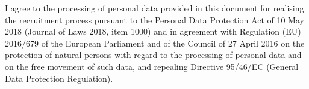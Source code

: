 \documentclass[A4,11pt]{article}
\begin{document}
{\tiny 
  I agree to the processing of personal data provided in this document for realising
  the recruitment process pursuant to the Personal Data Protection Act of 10 May 2018 (Journal of
  Laws 2018, item 1000) and in agreement with Regulation (EU) 2016/679 of the European Parliament
  and of the Council of 27 April 2016 on the protection of natural persons with regard to the
  processing of personal data and on the free movement of such data, and repealing Directive 95/46/EC
  (General Data Protection Regulation).
}
\end{document}
